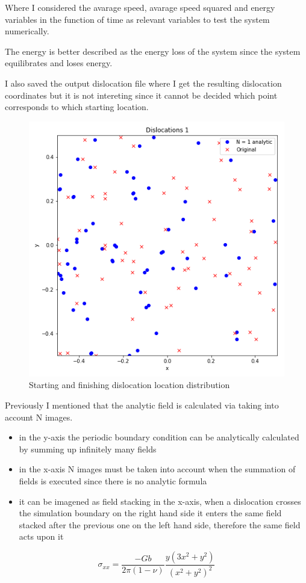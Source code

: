 \documentclass[12pt,a4paper]{article}
\theoremstyle{plain}
\begin{document}
\begin{multicols*}{2}
	\par Where I considered the avarage speed, avarage speed squared and energy variables in the function of time
	as relevant variables to test the system numerically.

	\par The energy is better described as the energy loss of the system since the system equilibrates
	and loses energy.

	\par I also saved the output dislocation file where I get the
	resulting dislocation coordinates but it is not intereting since it cannot
	be decided which point corresponds to which starting location.

	\begin{figure}[H]
		\centering
		\includegraphics[width=0.4\columnwidth]{Dislocations1.png}
		\caption{Starting and finishing dislocation location distribution}
	\end{figure}

	\par Previously I mentioned that the analytic field is calculated via taking into account N images.

	\begin{itemize}
		\item in the y-axis the periodic boundary condition can be analytically calculated by summing up infinitely many fields
		\item in the x-axis N images must be taken into account when the summation of fields is executed since there is no analytic formula
		\item it can be imagened as field stacking in the x-axis, when a dislocation crosses the simulation boundary on the right hand side it enters the same field stacked after the previous one on the left hand side, therefore the same field acts upon it
	\end{itemize}

	\begin{equation*}
		\sigma_{xx} = \frac{-Gb}{2\pi(1-\nu)}\frac{y(3x^{2} + y^{2})}{(x^{2} + y^{2})^{2}}
	\end{equation*}


\end{multicols*}
\end{document}
